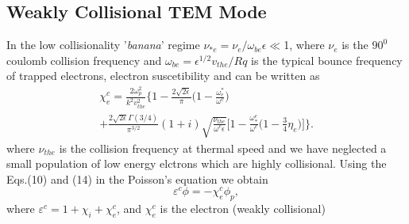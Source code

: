 \documentclass[aip,pop,amsmath,amssymb,showpacs,reprint,floatfix,lengthcheck]{revtex4-1}
\begin{document}
\subsection{Weakly Collisional TEM Mode}
In the low collisionality '\textit{banana}' regime $\nu_{*e}=\nu_{e}/\omega_{be}\epsilon\ll$1, where $\nu_{e}$ is the $90^{0}$ coulomb collision frequency and $\omega_{be}=\epsilon^{1/2}v_{the}/Rq$ is the typical bounce frequency of trapped electrons, electron suscetibility and can be written as \cite{connor2006stability} 
\begin{eqnarray}
\chi_{e}^c=\frac{2\omega_{p}^2}{k^2v_{the}^2}\biggl\{1-\frac{2\sqrt{2\epsilon}}{\pi}\biggl(1-\frac{\omega_{e}^{*}}{\omega^c}\biggr)\nonumber\\
+\frac{2\sqrt{2\epsilon}\Gamma(3/4)}{\pi^{3/2}}(1+i)\sqrt{\frac{\nu_{the}}{\omega^c\epsilon}}\biggl[1-\frac{\omega_{*}^{e}}{\omega^c}\biggl(1-\frac{3}{4}\eta_{e}\biggr)\biggr]\biggr\}.
\end{eqnarray}
where $\nu_{the}$ is the collision frequency at thermal speed and we have neglected a small population of low energy elctrons which are highly collisional. 
Using the Eqs.(10) and (14) in the Poisson's equation  we obtain
\begin{equation}
 \varepsilon^{c}\phi=-\chi_{e}^{c}\phi_{p},
\end{equation}
where $\varepsilon^{c}=1+\chi_{i}+\chi_{e}^{c}$, and $\chi_{e}^{c}$ is the electron (weakly collisional) 
\end{document}
